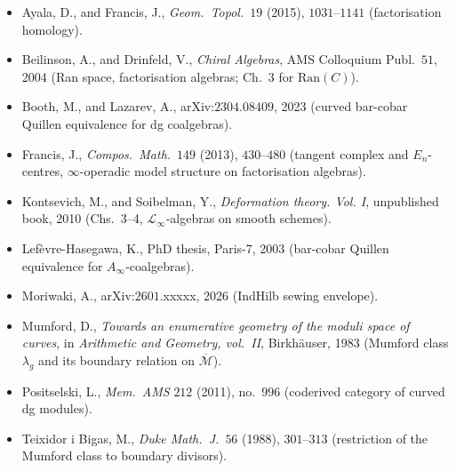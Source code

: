 \documentclass[11pt]{amsart}
\newcommand{\cL}{\mathcal{L}}
\newcommand{\cM}{\mathcal{M}}
\newcommand{\Ran}{\mathrm{Ran}}
\newcommand{\Mbar}{\overline{\cM}}
\begin{document}
\begin{itemize}
\item Ayala, D., and Francis, J., \emph{Geom.\ Topol.}\ $19$ (2015),
$1031$--$1141$ (factorisation homology).
\item Beilinson, A., and Drinfeld, V., \emph{Chiral Algebras},
AMS Colloquium Publ.\ $51$, 2004 (Ran space, factorisation
algebras; Ch.~3 for $\Ran(C)$).
\item Booth, M., and Lazarev, A., arXiv:$2304.08409$, 2023 (curved
bar-cobar Quillen equivalence for dg coalgebras).
\item Francis, J., \emph{Compos.\ Math.}\ $149$ (2013), $430$--$480$
(tangent complex and $E_n$-centres, $\infty$-operadic model
structure on factorisation algebras).
\item Kontsevich, M., and Soibelman, Y., \emph{Deformation theory.
Vol. I}, unpublished book, 2010 (Chs.~3--4, $\cL_\infty$-algebras
on smooth schemes).
\item Lef\`evre-Hasegawa, K., PhD thesis, Paris-7, 2003 (bar-cobar
Quillen equivalence for $A_\infty$-coalgebras).
\item Moriwaki, A., arXiv:$2601$.xxxxx, 2026 (IndHilb sewing
envelope).
\item Mumford, D., \emph{Towards an enumerative geometry of the
moduli space of curves}, in \emph{Arithmetic and Geometry, vol.\ II},
Birkh\"auser, 1983 (Mumford class $\lambda_g$ and its boundary
relation on $\Mbar$).
\item Positselski, L., \emph{Mem.\ AMS} $212$ (2011), no.~$996$
(coderived category of curved dg modules).
\item Teixidor i Bigas, M., \emph{Duke Math.\ J.}\ $56$ (1988),
$301$--$313$ (restriction of the Mumford class to boundary
divisors).
\end{itemize}
\end{document}
